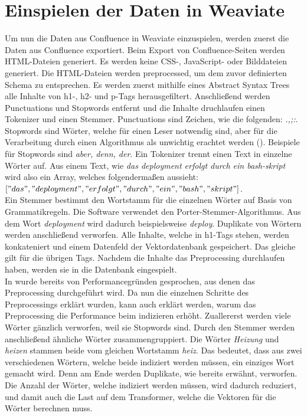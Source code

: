 \section{Einspielen der Daten in Weaviate}
\label{chap:einspielen-der-daten-in-weaviate}
Um nun die Daten aus Confluence in Weaviate einzuspielen, werden zuerst die Daten aus Confluence exportiert.
Beim Export von Confluence-Seiten werden HTML-Dateien generiert.
Es werden keine CSS-, JavaScript- oder Bilddateien generiert.
Die HTML-Dateien werden preprocessed, um dem zuvor definierten Schema zu entsprechen.
Es werden zuerst mithilfe eines Abstract Syntax Trees alle Inhalte von h1-, h2- und p-Tags herausgefiltert.
Anschließend werden Punctuations und Stopwords entfernt und die Inhalte druchlaufen einen Tokenizer und einen Stemmer.
Punctuations sind Zeichen, wie die folgenden: \textit{.,;:}.
Stopwords sind Wörter, welche für einen Leser notwendig sind, aber für die Verarbeitung durch einen Algorithmus als unwichtig erachtet werden (\cite{Sarica_Luo_2021}).
Beispiele für Stopwords sind \textit{aber, denn, der}.
Ein Tokenizer trennt einen Text in einzelne Wörter auf.
Aus einem Text, wie \textit{das deployment erfolgt durch ein bash-skript} wird also ein Array, welches folgendermaßen aussieht:\\

\(["das", "deployment", "erfolgt", "durch", "ein", "bash", "skript"]\).\\

Ein Stemmer bestimmt den Wortstamm für die einzelnen Wörter auf Basis von Grammatikregeln.
Die Software verwendet den Porter-Stemmer-Algorithmus.
Aus dem Wort \textit{deployment} wird dadurch beispielsweise \textit{deploy}.
Duplikate von Wörtern werden anschließend verworfen.
Alle Inhalte, welche in h1-Tags stehen, werden konkateniert und einem Datenfeld der Vektordatenbank gespeichert.
Das gleiche gilt für die übrigen Tags.
Nachdem die Inhalte das Preprocessing durchlaufen haben, werden sie in die Datenbank eingespielt.\\

In  wurde bereits von Performancegründen gesprochen, aus denen das Preprocessing durchgeführt wird.
Da nun die einzelnen Schritte des Preprocessings erklärt wurden, kann auch erklärt werden, warum das Preprocessing die Performance beim indizieren erhöht.
Zuallererst werden viele Wörter gänzlich verworfen, weil sie Stopwords sind.
Durch den Stemmer werden anschließend ähnliche Wörter zusammengruppiert.
Die Wörter \textit{Heizung} und \textit{heizen} stammen beide vom gleichen Wortstamm \textit{heiz}.
Das bedeutet, dass aus zwei verschiedenen Wörtern, welche beide indiziert werden müssen, ein einziges Wort gemacht wird.
Denn am Ende werden Duplikate, wie bereits erwähnt, verworfen.
Die Anzahl der Wörter, welche indiziert werden müssen, wird dadurch reduziert, und damit auch die Last auf dem Transformer, welche die Vektoren für die Wörter berechnen muss.